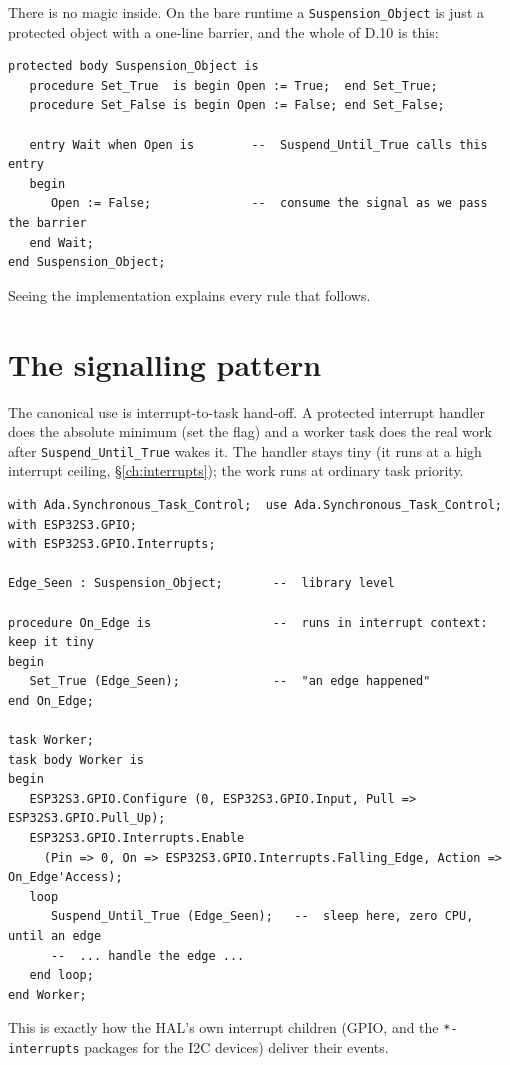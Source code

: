 There is no magic inside. On the bare runtime a \texttt{Suspension\_Object} is just
a protected object with a one-line barrier, and the whole of D.10 is this:

\begin{lstlisting}
protected body Suspension_Object is
   procedure Set_True  is begin Open := True;  end Set_True;
   procedure Set_False is begin Open := False; end Set_False;

   entry Wait when Open is        --  Suspend_Until_True calls this entry
   begin
      Open := False;              --  consume the signal as we pass the barrier
   end Wait;
end Suspension_Object;
\end{lstlisting}

Seeing the implementation explains every rule that follows.

\section{The signalling pattern}

The canonical use is interrupt-to-task hand-off. A protected interrupt handler does
the absolute minimum (set the flag) and a worker task does the real work after
\texttt{Suspend\_Until\_True} wakes it. The handler stays tiny (it runs at a high
interrupt ceiling, \S\ref{ch:interrupts}); the work runs at ordinary task priority.

\begin{lstlisting}
with Ada.Synchronous_Task_Control;  use Ada.Synchronous_Task_Control;
with ESP32S3.GPIO;
with ESP32S3.GPIO.Interrupts;

Edge_Seen : Suspension_Object;       --  library level

procedure On_Edge is                 --  runs in interrupt context: keep it tiny
begin
   Set_True (Edge_Seen);             --  "an edge happened"
end On_Edge;

task Worker;
task body Worker is
begin
   ESP32S3.GPIO.Configure (0, ESP32S3.GPIO.Input, Pull => ESP32S3.GPIO.Pull_Up);
   ESP32S3.GPIO.Interrupts.Enable
     (Pin => 0, On => ESP32S3.GPIO.Interrupts.Falling_Edge, Action => On_Edge'Access);
   loop
      Suspend_Until_True (Edge_Seen);   --  sleep here, zero CPU, until an edge
      --  ... handle the edge ...
   end loop;
end Worker;
\end{lstlisting}

This is exactly how the HAL's own interrupt children (GPIO, and the
\texttt{*-interrupts} packages for the I2C devices) deliver their events.

